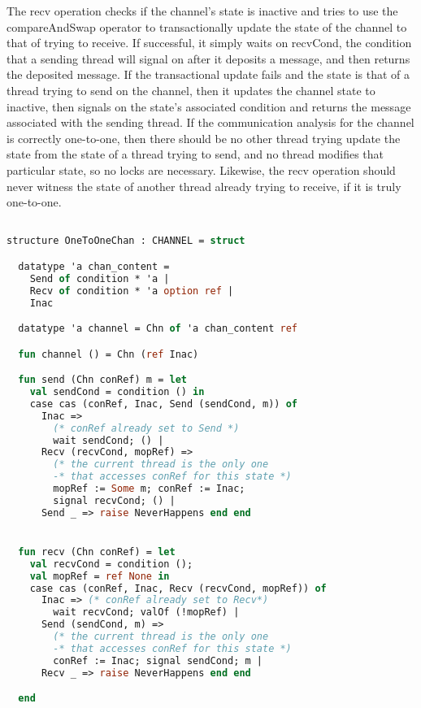 \documentclass{article}
\begin{document}
The recv operation checks if the channel's state is inactive and tries to use the
compareAndSwap operator to transactionally update the state of the channel to that of trying
to receive.  If successful, it simply waits on recvCond, the condition that a sending thread
will signal on after it deposits a message, and then returns the deposited message.  If the
transactional update fails and the state is that of a thread trying to send on the channel,
then it updates the channel state to inactive, then signals on the state's associated
condition and returns the message associated with the sending thread.  If the communication
analysis for the channel is correctly one-to-one, then there should be no other thread trying
update the state from the state of a thread trying to send, and no thread modifies that
particular state, so no locks are necessary.  Likewise, the recv operation should never
witness the state of another thread already trying to receive, if it is truly one-to-one.

\begin{lstlisting}[language=ML, escapechar=\%]

structure OneToOneChan : CHANNEL = struct

  datatype 'a chan_content =
    Send of condition * 'a |
    Recv of condition * 'a option ref |
    Inac  

  datatype 'a channel = Chn of 'a chan_content ref

  fun channel () = Chn (ref Inac)

  fun send (Chn conRef) m = let
    val sendCond = condition () in
    case cas (conRef, Inac, Send (sendCond, m)) of
      Inac => 
        (* conRef already set to Send *)
        wait sendCond; () |
      Recv (recvCond, mopRef) =>
        (* the current thread is the only one
        -* that accesses conRef for this state *)
        mopRef := Some m; conRef := Inac;
        signal recvCond; () |
      Send _ => raise NeverHappens end end


  fun recv (Chn conRef) = let
    val recvCond = condition ();
    val mopRef = ref None in
    case cas (conRef, Inac, Recv (recvCond, mopRef)) of
      Inac => (* conRef already set to Recv*)
        wait recvCond; valOf (!mopRef) |
      Send (sendCond, m) =>
        (* the current thread is the only one
        -* that accesses conRef for this state *)
        conRef := Inac; signal sendCond; m |
      Recv _ => raise NeverHappens end end 

  end
  \end{lstlisting}
\end{document}
